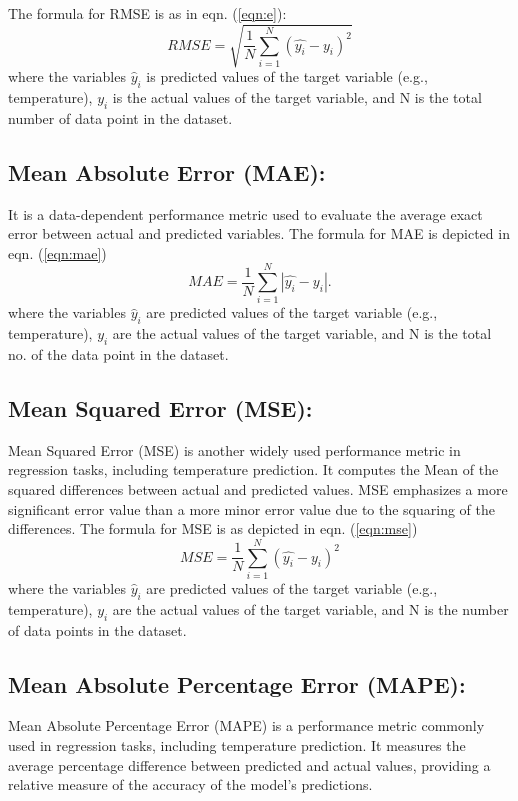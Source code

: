 The formula for RMSE is as in eqn. (\ref{eqn:e}):
\begin{equation}
\label{eqn:e}
RMSE = \sqrt {\frac{1}{N} \sum_{i=1}^{N} (\hat{y_{i}} - y_{i})^2}
\end{equation}
where the variables $\hat{y}_i$ is predicted values of the target variable (e.g., temperature), $y_i$ is the actual values of the target variable, and N is the total number of data point in the dataset.
\subsection{Mean Absolute Error (MAE):} It is a data-dependent performance metric used to evaluate the average exact error between actual and predicted variables. The formula for MAE is depicted in eqn. (\ref{eqn:mae})
\begin{equation}
\label{eqn:mae}
MAE = \frac{1}{N} \sum_{i=1}^{N} \left|\hat{y_{i}} - y_{i}\right| .
\end{equation}
where the variables $\hat{y}_i$ are predicted values of the target variable (e.g., temperature), $y_i$ are the actual values of the target variable, and N is the total no. of the data point in the dataset.

\subsection{Mean Squared Error (MSE):}
Mean Squared Error (MSE) is another widely used performance metric in regression tasks, including temperature prediction. It computes the Mean of the squared differences between actual and predicted values. MSE emphasizes a more significant error value than a more minor error value due to the squaring of the differences.
The formula for MSE is as depicted in eqn. (\ref{eqn:mse})
\begin{equation}
\label{eqn:mse}
MSE = \frac{1}{N} \sum_{i=1}^{N} (\hat{y_{i}} - y_{i})^2
\end{equation}
where the variables $\hat{y}_i$ are predicted values of the target variable (e.g., temperature), $y_i$ are the actual values of the target variable, and N is the number of data points in the dataset.


\subsection{Mean Absolute Percentage Error (MAPE):}
Mean Absolute Percentage Error (MAPE) is a performance metric commonly used in regression tasks, including temperature prediction. It measures the average percentage difference between predicted and actual values, providing a relative measure of the accuracy of the model's predictions.

